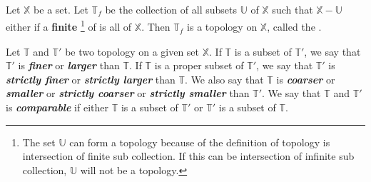       \begin{definition}\label{def:FiniteComplementTopology}
            Let $ \mathbb{X} $ be a set. Let $ \mathbb{T}_{\mathit{f}} $ be the collection of all subsets $ \mathbb{U} $ of $ \mathbb{X} $ such that $ \mathbb{X} - \mathbb{U} $ either if a \textbf{finite} \footnote{
                  The set $ \mathbb{U} $ can form a topology because of the definition of topology is intersection of finite sub collection. If this can be intersection of infinite sub collection, $ \mathbb{U} $ will not be a topology. 
            } of is all of $ \mathbb{X} $. Then $ \mathbb{T}_{\mathit{f}} $ is a topology on $ \mathbb{X} $, called the .
      \end{definition}

      \begin{definition}\label{def:Comparable}
            Let $ \mathbb{T} $ and $ \mathbb{T'} $ be two topology on a given set $ \mathbb{X} $. If $ \mathbb{T} $ is  a subset of $ \mathbb{T'} $, we say that $ \mathbb{T'} $ is \textit{\textbf{finer}} or \textit{\textbf{larger}} than $ \mathbb{T} $. If $ \mathbb{T} $ is a proper subset of $ \mathbb{T'} $, we say that $ \mathbb{T'} $ is \textit{\textbf{strictly finer}} or \textit{\textbf{strictly larger}}  than $ \mathbb{T} $.
            We also say that $ \mathbb{T} $ is \textit{\textbf{coarser}} or \textit{\textbf{smaller}} or \textit{\textbf{strictly coarser}} or \textit{\textbf{strictly smaller}} than $ \mathbb{T'} $.
            We say that $ \mathbb{T} $ and $ \mathbb{T'} $ is \textit{\textbf{comparable}} if either $ \mathbb{T} $ is a subset of $ \mathbb{T'} $ or $ \mathbb{T'} $ is a subset of $ \mathbb{T} $.
      \end{definition}

